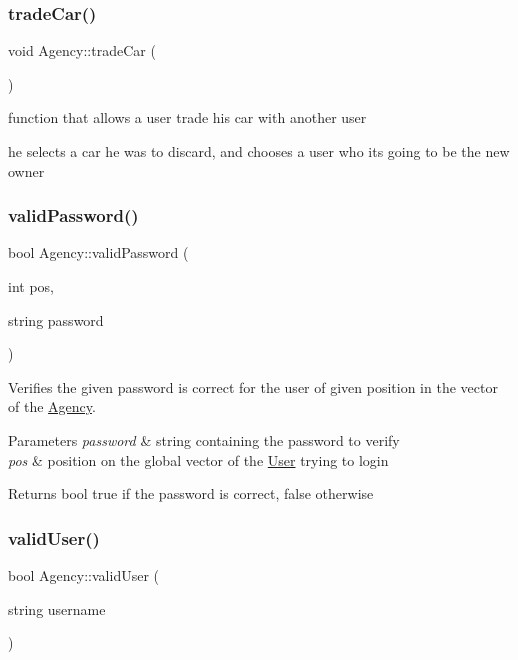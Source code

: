 \subsubsection{\texorpdfstring{trade\+Car()}{tradeCar()}}
{\footnotesize\ttfamily void Agency\+::trade\+Car (\begin{DoxyParamCaption}{ }\end{DoxyParamCaption})}



function that allows a user trade his car with another user 

he selects a car he was to discard, and chooses a user who its going to be the new owner \mbox{\label{group___agency_ga12c6a13fdeaaa5a2adab736313b3d180}} 
\subsubsection{\texorpdfstring{valid\+Password()}{validPassword()}}
{\footnotesize\ttfamily bool Agency\+::valid\+Password (\begin{DoxyParamCaption}\item[{int}]{pos,  }\item[{string}]{password }\end{DoxyParamCaption})}



Verifies the given password is correct for the user of given position in the vector of the \hyperlink{class_agency}{Agency}. 


\begin{DoxyParams}{Parameters}
{\em password} & string containing the password to verify \\
\hline
{\em pos} & position on the global vector of the \hyperlink{class_user}{User} trying to login\\
\hline
\end{DoxyParams}
\begin{DoxyReturn}{Returns}
bool true if the password is correct, false otherwise 
\end{DoxyReturn}
\mbox{\label{group___agency_ga633274c6bc861317f03bf378e5286312}} 
\subsubsection{\texorpdfstring{valid\+User()}{validUser()}}
{\footnotesize\ttfamily bool Agency\+::valid\+User (\begin{DoxyParamCaption}\item[{string}]{username }\end{DoxyParamCaption})}



